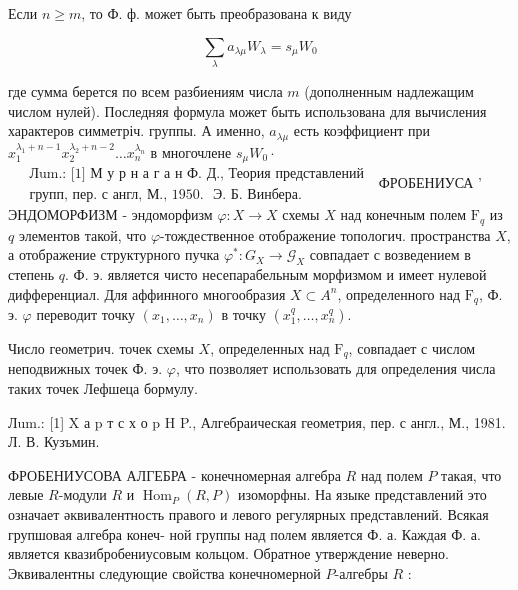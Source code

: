\documentclass[10pt]{article}
\begin{document}
Если $n \geqslant m$, то Ф. ф. может быть преобразована к виду



\[

\sum_{\lambda} a_{\lambda \mu} W_{\lambda}=s_{\mu} W_{0}

\]



где сумма берется по всем разбиениям числа $m$ (дополненным надлежащим числом нулей). Последняя формула может быть использована для вычисления характеров симметріч. группы. А именно, $a_{\lambda \mu}$ есть коэффициент при $x_{1}^{\lambda_{1}+n-1} x_{2}^{\lambda_{2}+n-2} \ldots x_{n}^{\lambda_{n}}$ в многочлене $s_{\mu} W_{0} \cdot$ $\begin{aligned} & \text { Лum.: [1] М у р н а г а н Ф. Д., Теория представлений } \\ & \text { групп, пер. с англ, М., 1950. } \text { Э. Б. Винбера. }\end{aligned}$ ФРОБЕНИУСА ' ЭНДОМОРФИЗМ - эндоморфизм $\varphi: X \longrightarrow X$ схемы $X$ над конечным полем $\mathrm{F}_{q}$ из $q$ элементов такой, что $\varphi$-тождественное отображение топологич. пространства $X$, а отображение структурного пучка $\varphi^{*}: G_{X} \rightarrow \mathcal{G}_{X}$ совпадает с возведением в степень $q$. Ф. э. является чисто несепарабельным морфизмом и имеет нулевой дифференциал. Для аффинного многообразия $X \subset A^{n}$, определенного над $\mathrm{F}_{q}$, Ф. э. $\varphi$ переводит точку $\left(x_{1}, \ldots, x_{n}\right)$ в точку $\left(x_{1}^{q}, \ldots, x_{n}^{q}\right)$.



Число геометрич. точек схемы $X$, определенных над $\mathrm{F}_{q}$, совпадает с числом неподвижных точек Ф. э. $\varphi$, что позволяет использовать для определения числа таких точек Лефшеца бормулу.



Лum.: [1] X а p т с х о p H P., Алгебраическая геометрия, пер. с англ., М., 1981. Л. В. Кузъмин.



ФРОБЕНИУСОВА АЛГЕБРА - конечномерная алгебра $R$ над полем $P$ такая, что левые $R$-модули $R$ и $\operatorname{Hom}_{P}(R, P)$ изоморфны. На языке представлений это означает әквивалентность правого и левого регулярных представлений. Всякая групшовая алгебра конеч- ной группы над полем является Ф. а. Каждая Ф. а. является квазибробениусовым кольцом. Обратное утверждение неверно. Эквивалентны следующие свойства конечномерной $P$-алгебры $R$ :
\end{document}
